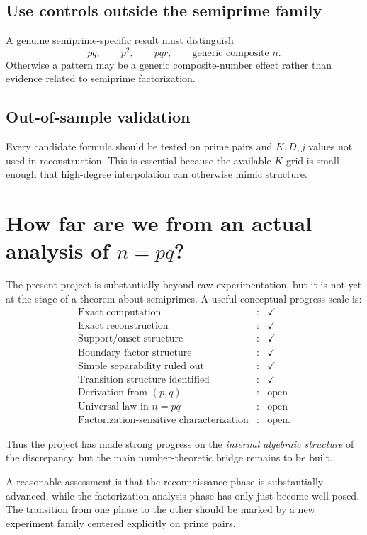 \documentclass[11pt,a4paper]{article}
\begin{document}
\subsection{Use controls outside the semiprime family}
A genuine semiprime-specific result must distinguish
\[
pq,
\qquad
p^2,
\qquad
pqr,
\qquad
\text{generic composite }n.
\]
Otherwise a pattern may be a generic composite-number effect rather than evidence related to semiprime factorization.

\subsection{Out-of-sample validation}
Every candidate formula should be tested on prime pairs and $K,D,j$ values not used in reconstruction. This is essential because the available $K$-grid is small enough that high-degree interpolation can otherwise mimic structure.

\section{How far are we from an actual analysis of $n=pq$?}

The present project is substantially beyond raw experimentation, but it is not yet at the stage of a theorem about semiprimes.
A useful conceptual progress scale is:
\[
\begin{array}{lll}
\text{Exact computation} &:& \checkmark\\
\text{Exact reconstruction} &:& \checkmark\\
\text{Support/onset structure} &:& \checkmark\\
\text{Boundary factor structure} &:& \checkmark\\
\text{Simple separability ruled out} &:& \checkmark\\
\text{Transition structure identified} &:& \checkmark\\
\text{Derivation from }(p,q) &:& \text{open}\\
\text{Universal law in }n=pq &:& \text{open}\\
\text{Factorization-sensitive characterization} &:& \text{open}.
\end{array}
\]

Thus the project has made strong progress on the \emph{internal algebraic structure} of the discrepancy, but the main number-theoretic bridge remains to be built.

A reasonable assessment is that the reconnaissance phase is substantially advanced, while the factorization-analysis phase has only just become well-posed. The transition from one phase to the other should be marked by a new experiment family centered explicitly on prime pairs.
\end{document}
